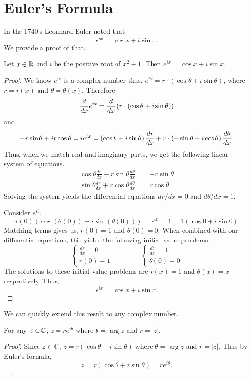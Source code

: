 \documentclass[notitlepage]{simple}
\begin{document}
\section{Euler's Formula}

In the 1740's Leonhard Euler noted that
\[
	e^{ix}=\cos x + i\sin x.
\]
We provide a proof of that.
\begin{thm}
	Let $x\in\mathbb{R}$ and $i$ be the positive root of $x^2+1$.
	Then $e^{ix} = \cos x + i \sin x$.
\end{thm}
\begin{proof}
	We know $e^{ix}$ is a complex number thus, $e^{ix}=r\cdot(\cos \theta+ i\sin \theta)$, where $r=r(x)$ and $\theta = \theta(x)$.
	Therefore
	\[
		\frac{d}{dx} e^{ix} = \frac{d}{dx}\left( r\cdot\left( \cos \theta+ i\sin \theta \right) \right)
	\]
	and
	\[
		-r\sin\theta + ir\cos\theta =
		ie^{ix} =
		\left( \cos \theta+ i\sin \theta \right)\frac{dr}{dx} + r\cdot\left( -\sin \theta+ i\cos \theta \right)\frac{d\theta}{dx}.
	\]
	Thus, when we match real and imaginary parts, we get the following linear system of equations.
	\begin{align*}
		\cos \theta\frac{dr}{dx} - r\sin\theta\frac{d\theta}{dx} &= -r\sin\theta\\
		\sin \theta\frac{dr}{dx} + r\cos\theta\frac{d\theta}{dx} &=  r\cos\theta
	\end{align*}
	Solving the system yields the differential equations $dr/dx = 0$ and $d\theta/dx = 1$.

	Consider $e^{i0}$.
	\[
		r(0)(\cos(\theta(0))+ i\sin(\theta(0)))=e^{i0}=1=1(\cos 0 + i\sin 0)
	\]
	Matching terms gives us, $r(0)=1$ and $\theta(0)=0$.
	When combined with our differential equations, this yields the following initial value problems.
	\[
		\begin{cases}
			\frac{dr}{dx}=0\\
			r(0)=1
		\end{cases}
		\hspace{4em}
		\begin{cases}
			\frac{d\theta}{dx}=1\\
			\theta(0)=0
		\end{cases}
	\]
	The solutions to these initial value problems are $r(x)=1$ and $\theta(x)=x$ respectively.
	Thus,
	\[
		e^{ix}=\cos x + i\sin x.
	\]
\end{proof}

We can quickly extend this result to any complex number.

\begin{corollary}
	For any $z\in\mathbb{C}$, $z=re^{i\theta}$ where $\theta=\arg z$ and $r=|z|$.
\end{corollary}
\begin{proof}
	Since $z\in\mathbb{C}$, $z=r(\cos \theta + i\sin \theta)$ where $\theta = \arg z$ and $r=|z|$.
	Thus by Euler's formula,
	\[
		z=r(\cos \theta + i\sin \theta) = re^{i\theta}.
	\]
\end{proof}
\end{document}

